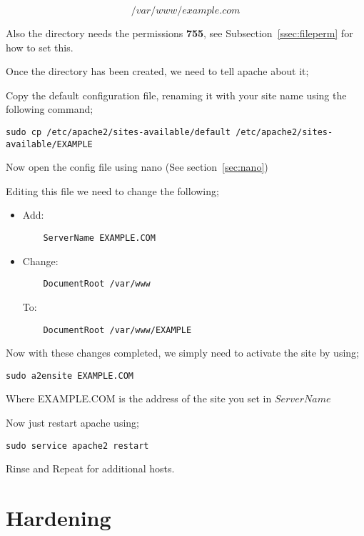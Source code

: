 $$
/var/www/example.com
$$

Also the directory needs the permissions \textbf{755}, see Subsection~\ref{ssec:fileperm} for how to set this.

Once the directory has been created, we need to tell apache about it;

Copy the default configuration file, renaming it with your site name using the following command;

\begin{lstlisting}
sudo cp /etc/apache2/sites-available/default /etc/apache2/sites-available/EXAMPLE
\end{lstlisting}

Now open the config file using nano (See section~\ref{sec:nano})

Editing this file we need to change the following;

\begin{itemize}
\item Add: 
	\begin{verbatim}
	ServerName EXAMPLE.COM
	\end{verbatim}
\item Change:
	\begin{verbatim}
	DocumentRoot /var/www
	\end{verbatim}
	
	To:
	\begin{verbatim}
	DocumentRoot /var/www/EXAMPLE
	\end{verbatim}
\end{itemize}

Now with these changes completed, we simply need to activate the site by using;

\begin{lstlisting}
sudo a2ensite EXAMPLE.COM
\end{lstlisting}

Where EXAMPLE.COM is the address of the site you set in $ServerName$

Now just restart apache using;

\begin{lstlisting}
sudo service apache2 restart
\end{lstlisting}

Rinse and Repeat for additional hosts.

\section{Hardening}

